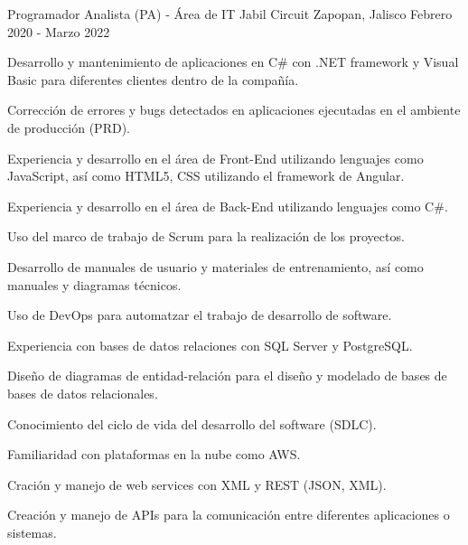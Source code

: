 \begin{cventries}
\cventry
{Programador Analista (PA) - Área de IT} %
{Jabil Circuit} %
{Zapopan, Jalisco} %
{Febrero 2020 - Marzo 2022} %
{ %
\begin{cvitems}
\item {Desarrollo y mantenimiento de aplicaciones en C\# con .NET framework y Visual Basic para diferentes clientes dentro de la compañía.}
\item {Corrección de errores y bugs detectados en aplicaciones ejecutadas en el ambiente de producción (PRD).}
\item {Experiencia y desarrollo en el área de Front-End utilizando lenguajes como JavaScript, así como HTML5, CSS utilizando el framework de Angular.}
\item {Experiencia y desarrollo en el área de Back-End utilizando lenguajes como C\#.}
\item{Uso del marco de trabajo de Scrum para la realización de los proyectos.}
\item {Desarrollo de manuales de usuario y materiales de entrenamiento, así como manuales y diagramas técnicos.}
\item {Uso de DevOps para automatzar el trabajo de desarrollo de software.}
\item {Experiencia con bases de datos relaciones con SQL Server y PostgreSQL.}
\item {Diseño de diagramas de entidad-relación para el diseño y modelado de bases de bases de datos relacionales.}
\item {Conocimiento del ciclo de vida del desarrollo del software (SDLC).}
\item {Familiaridad con plataformas en la nube como AWS.}
\item {Cración y manejo de web services con XML y REST (JSON, XML).}
\item {Creación y manejo de APIs para la comunicación entre diferentes aplicaciones o sistemas.}
\end{cvitems}
}



\end{cventries}
